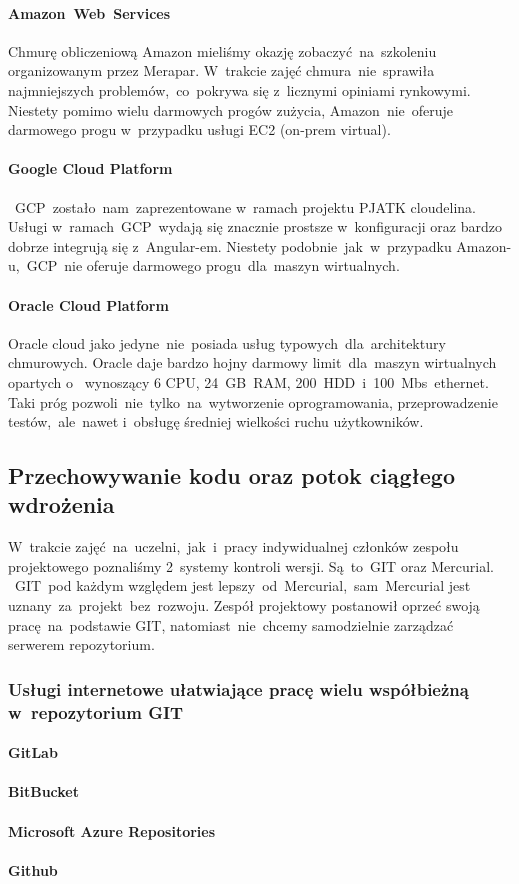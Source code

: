 \paragraph{Amazon~Web~Services}
Chmurę obliczeniową Amazon mieliśmy okazję zobaczyć~na~szkoleniu organizowanym przez Merapar.
W~trakcie zajęć chmura~nie~sprawiła najmniejszych problemów,~co~pokrywa się z~licznymi opiniami rynkowymi.
Niestety pomimo wielu darmowych progów zużycia, Amazon~nie~oferuje darmowego progu w~przypadku usługi EC2 (\gls{on-prem} virtual).

\paragraph{Google Cloud Platform}~GCP~zostało~nam~zaprezentowane w~ramach projektu PJATK cloudelina.
Usługi w~ramach~GCP~wydają się znacznie prostsze w~konfiguracji oraz bardzo dobrze integrują się z~Angular-em.
Niestety podobnie~jak~w~przypadku Amazon-u,~GCP~nie oferuje darmowego progu~dla~maszyn wirtualnych.

\paragraph{Oracle Cloud Platform}
Oracle cloud jako jedyne~nie~posiada usług typowych~dla~architektury chmurowych.
Oracle daje bardzo hojny darmowy limit~dla~maszyn wirtualnych opartych o~ wynoszący 6 CPU, 24~GB~RAM, 200~HDD~i~100~Mbs~ethernet.
Taki próg pozwoli~nie~tylko~na~wytworzenie oprogramowania, przeprowadzenie testów,~ale~nawet i~obsługę średniej wielkości ruchu użytkowników.

\subsection{Przechowywanie kodu oraz potok ciągłego wdrożenia}
\label{subsec:przechowywanie-kodu-oraz-potok-ciagego-wdrozenia}

W~trakcie zajęć~na~uczelni,~jak~i~pracy indywidualnej członków zespołu projektowego poznaliśmy 2~systemy kontroli wersji.
Są~to~GIT oraz Mercurial.
~GIT~pod każdym względem jest lepszy~od~Mercurial,~sam~Mercurial jest uznany~za~projekt~bez~rozwoju.
Zespół projektowy postanowił oprzeć swoją pracę~na~podstawie GIT, natomiast~nie~chcemy samodzielnie zarządzać serwerem repozytorium.

\subsubsection{Usługi internetowe ułatwiające pracę wielu współbieżną w~repozytorium GIT}
\paragraph{GitLab}
\paragraph{BitBucket}
\paragraph{Microsoft Azure Repositories}
\paragraph{Github}
